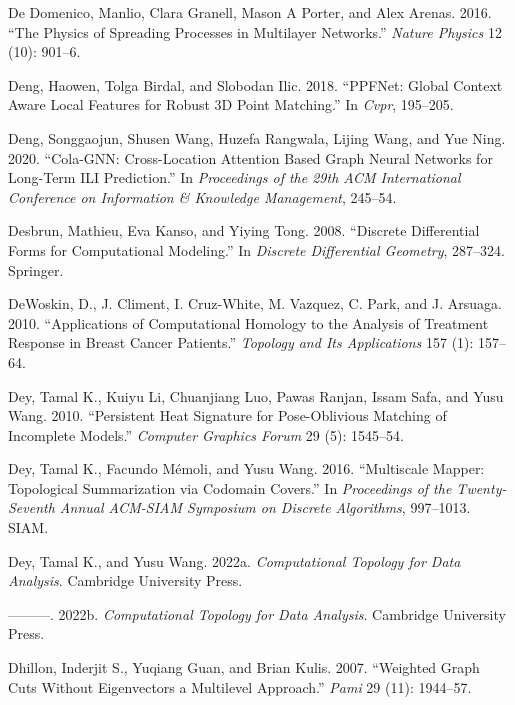 \documentclass[
  12pt,
]{krantz}
\newlength{\cslhangindent}
\newenvironment{CSLReferences}[2] %
 {\begin{list}{}{%
  \setlength{\itemindent}{0pt}
  \setlength{\leftmargin}{0pt}
  \setlength{\parsep}{0pt}
  \ifodd #1
   \setlength{\leftmargin}{\cslhangindent}
   \setlength{\itemindent}{-1\cslhangindent}
  \fi
  \setlength{\itemsep}{#2\baselineskip}}}
 {\end{list}}
\begin{document}
\begin{CSLReferences}{1}{0}
De Domenico, Manlio, Clara Granell, Mason A Porter, and Alex Arenas.
2016. {``The Physics of Spreading Processes in Multilayer Networks.''}
\emph{Nature Physics} 12 (10): 901--6.

Deng, Haowen, Tolga Birdal, and Slobodan Ilic. 2018. {``{PPFNet}: Global
Context Aware Local Features for Robust 3{D} Point Matching.''} In
\emph{Cvpr}, 195--205.

Deng, Songgaojun, Shusen Wang, Huzefa Rangwala, Lijing Wang, and Yue
Ning. 2020. {``Cola-{GNN}: Cross-Location Attention Based Graph Neural
Networks for Long-Term {ILI} Prediction.''} In \emph{Proceedings of the
29th ACM International Conference on Information \& Knowledge
Management}, 245--54.

Desbrun, Mathieu, Eva Kanso, and Yiying Tong. 2008. {``Discrete
Differential Forms for Computational Modeling.''} In \emph{Discrete
Differential Geometry}, 287--324. Springer.

DeWoskin, D., J. Climent, I. Cruz-White, M. Vazquez, C. Park, and J.
Arsuaga. 2010. {``Applications of Computational Homology to the Analysis
of Treatment Response in Breast Cancer Patients.''} \emph{Topology and
Its Applications} 157 (1): 157--64.

Dey, Tamal K., Kuiyu Li, Chuanjiang Luo, Pawas Ranjan, Issam Safa, and
Yusu Wang. 2010. {``Persistent Heat Signature for Pose-Oblivious
Matching of Incomplete Models.''} \emph{Computer Graphics Forum} 29 (5):
1545--54.

Dey, Tamal K., Facundo Mémoli, and Yusu Wang. 2016. {``Multiscale
Mapper: Topological Summarization via Codomain Covers.''} In
\emph{Proceedings of the Twenty-Seventh Annual ACM-SIAM Symposium on
Discrete Algorithms}, 997--1013. SIAM.

Dey, Tamal K., and Yusu Wang. 2022a. \emph{Computational Topology for
Data Analysis}. Cambridge University Press.

---------. 2022b. \emph{Computational Topology for Data Analysis}.
Cambridge University Press.

Dhillon, Inderjit S., Yuqiang Guan, and Brian Kulis. 2007. {``Weighted
Graph Cuts Without Eigenvectors a Multilevel Approach.''} \emph{Pami} 29
(11): 1944--57.


\end{CSLReferences}
\end{document}
